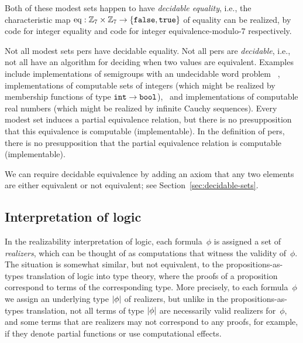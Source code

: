 Both of these modest sets happen to have \emph{decidable equality},
i.e., the characteristic map $\mathrm{eq} : \mathbb{Z}_7 \times
\mathbb{Z}_7 \to \{\mathtt{false}, \mathtt{true}\}$ of equality can be 
realized, by code for integer equality and code for integer equivalence-modulo-7
respectively.
\fi %

\iflong
Not all modest sets pers have decidable equality.
\else
Not all pers are \emph{decidable}, i.e., not all have an algorithm for deciding
when two values are equivalent.
\fi
%
Examples include implementations of semigroups with an undecidable
word problem~\cite{post47:_recur_unsol_probl_thue}%
\iflong, implementations of computable sets of integers (which might
be realized by membership functions of type $\mathtt{int}\to\mathtt{bool}$),\fi
\ and implementations of computable real numbers (which might be
realized by infinite Cauchy sequences).
%
\iflong
%
Every modest set induces a partial
equivalence relation, but there is no presupposition that this
equivalence is computable (implementable).
%
\else
%
In the definition of pers, there is no presupposition that the partial
equivalence relation is computable (implementable).
%
\fi

We can require decidable equivalence by adding an axiom that any two
elements are either equivalent or not equivalent; see
Section~\ref{sec:decidable-sets}.

\iflong\else\goodbreak\fi

\subsection{Interpretation of logic}
\label{sec:interpretation-logic}

In the realizability interpretation of logic, each formula~$\phi$ is
assigned a set of \emph{realizers}, which can be thought of as
computations that witness the validity of~$\phi$. The situation is
somewhat similar, but not equivalent, to the propositions-as-types
translation of logic into type theory, where the proofs of a
proposition correspond to terms of the corresponding type. More
precisely, to each formula~$\phi$ we assign an underlying type
$|\phi|$ of realizers, but unlike in the propositions-as-types
translation, not all terms of type $|\phi|$ are necessarily
valid realizers for~$\phi$, and some terms that are realizers may not
correspond to any proofs, for example, if they denote partial
functions or use computational effects.

